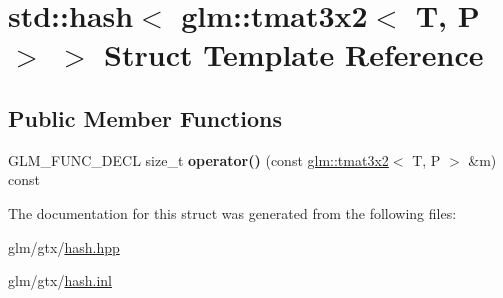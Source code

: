 \hypertarget{structstd_1_1hash_3_01glm_1_1tmat3x2_3_01T_00_01P_01_4_01_4}{\section{std\-:\-:hash$<$ glm\-:\-:tmat3x2$<$ T, P $>$ $>$ Struct Template Reference}
\label{structstd_1_1hash_3_01glm_1_1tmat3x2_3_01T_00_01P_01_4_01_4}
}
\subsection*{Public Member Functions}
\begin{DoxyCompactItemize}
\item 
\hypertarget{structstd_1_1hash_3_01glm_1_1tmat3x2_3_01T_00_01P_01_4_01_4_a5cecd45d73309e1111b36dbfa2cfeb5f}{G\-L\-M\-\_\-\-F\-U\-N\-C\-\_\-\-D\-E\-C\-L size\-\_\-t {\bfseries operator()} (const \hyperlink{structglm_1_1tmat3x2}{glm\-::tmat3x2}$<$ T, P $>$ \&m) const }\label{structstd_1_1hash_3_01glm_1_1tmat3x2_3_01T_00_01P_01_4_01_4_a5cecd45d73309e1111b36dbfa2cfeb5f}

\end{DoxyCompactItemize}


The documentation for this struct was generated from the following files\-:\begin{DoxyCompactItemize}
\item 
glm/gtx/\hyperlink{hash_8hpp}{hash.\-hpp}\item 
glm/gtx/\hyperlink{hash_8inl}{hash.\-inl}\end{DoxyCompactItemize}
